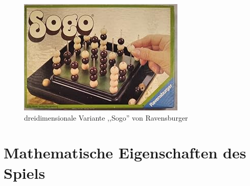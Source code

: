 \begin{figure}[H]
	\centering
	\includegraphics[width=0.8\linewidth]{images/Sogo}
	\caption[Sogo von Ravensburger ]{dreidimensionale Variante ,,Sogo'' von Ravensburger \autocite{abebooks_image}}
	\label{fig:Sogo}
\end{figure}
\newpage

\section{Mathematische Eigenschaften des Spiels}
%
%	
%

